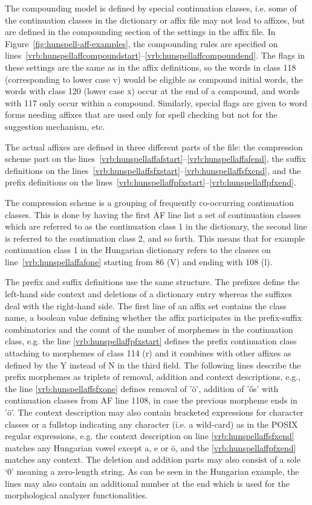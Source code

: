 \documentclass[a4paper,runningheads]{llncs}
\begin{document}
The compounding model is defined by special continuation classes,
i.e. some of the continuation classes in the dictionary or affix file
may not lead to affixes, but are defined in the compounding section of
the settings in the affix file. In
Figure~\ref{fig:hunspell-aff-examples}, the compounding rules are
specified on
lines~\ref{vrb:hunspellaffcompoundstart}--\ref{vrb:hunspellaffcompoundend}. The
flags in these settings are the same as in the affix definitions, so
the words in class 118 (corresponding to lower case v) would be
eligible as compound initial words, the words with class 120 (lower
case x) occur at the end of a compound, and words with 117 only occur
within a compound. Similarly, special flags are given to word forms
needing affixes that are used only for spell checking but not for the
suggestion mechanism, etc.

The actual affixes are defined in three different parts of the file:
the compression scheme part on the
lines~\ref{vrb:hunspellaffafstart}--\ref{vrb:hunspellaffafend}, the
suffix definitions on the
lines~\ref{vrb:hunspellaffsfxstart}--\ref{vrb:hunspellaffsfxend}, and
the prefix definitions on the
lines~\ref{vrb:hunspellaffpfxstart}--\ref{vrb:hunspellaffpfxend}.

The compression scheme is a grouping of frequently co-occurring
continuation classes. This is done by having the first AF line list a
set of continuation classes which are referred to as the continuation
class 1 in the dictionary, the second line is referred to the
continuation class 2, and so forth. This means that for example
continuation class 1 in the Hungarian dictionary refers to the classes
on line~\ref{vrb:hunspellaffafone} starting from 86 (V) and ending
with 108 (l).

The prefix and suffix definitions use the same structure. The prefixes
define the left-hand side context and deletions of a dictionary entry
whereas the suffixes deal with the right-hand side. The first line of
an affix set contains the class name, a boolean value defining whether
the affix participates in the prefix-suffix combinatorics and the
count of the number of morphemes in the continuation class, e.g. the
line \ref{vrb:hunspellaffpfxstart} defines the prefix continuation
class attaching to morphemes of class 114 (r) and it combines with
other affixes as defined by the Y instead of N in the third field. The
following lines describe the prefix morphemes as triplets of removal,
addition and context descriptions, e.g., the line
\ref{vrb:hunspellaffsfxone} defines removal of 'ö', addition of
'\H{o}s' with continuation classes from AF line 1108, in case the
previous morpheme ends in 'ö'. The context description may also
contain bracketed expressions for character classes or a fullstop
indicating any character (i.e. a wild-card) as in the POSIX regular
expressions, e.g. the context description on line
\ref{vrb:hunspellaffsfxend} matches any Hungarian vowel except a, e or
ö, and the \ref{vrb:hunspellaffpfxend} matches any context.  The
deletion and addition parts may also consist of a sole `0' meaning a
zero-length string. As can be seen in the Hungarian example, the lines
may also contain an additional number at the end which is used for the
morphological analyzer functionalities.
\end{document}
